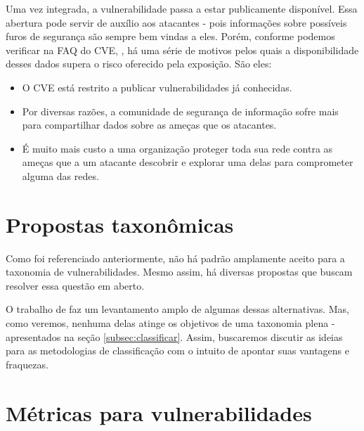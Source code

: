 			
			Uma vez integrada, a vulnerabilidade passa a estar publicamente disponível.
			Essa abertura pode servir de auxílio aos atacantes - pois informações
			sobre possíveis furos de segurança são sempre bem vindas a eles.
			Porém, conforme podemos verificar na FAQ do CVE, \cite{CVE2010}, há uma série
			de motivos pelos quais a disponibilidade desses dados supera o risco
			oferecido pela exposição. São eles:
			\begin{itemize}
				\item{O CVE está restrito a publicar vulnerabilidades já conhecidas.}
				\item{Por diversas razões, a comunidade de segurança de informação
					sofre mais para compartilhar dados sobre as ameças
					que os atacantes.}
				\item{É muito mais custo a uma organização proteger toda sua rede
					contra as ameças que a um atacante descobrir e explorar uma delas para
					comprometer alguma das redes.}
			\end{itemize}
			
			

		
		
		
	\section{Propostas taxonômicas}
		Como foi referenciado anteriormente, não há padrão amplamente aceito
		para a taxonomia de vulnerabilidades.
		Mesmo assim, há diversas propostas que buscam resolver essa questão em aberto.
		
		
		O trabalho de \cite{Gregio2005} faz um levantamento amplo de algumas
		dessas alternativas. Mas, como veremos, nenhuma delas atinge os objetivos
		de uma taxonomia plena - apresentados na seção \ref{subsec:classificar}.
		Assim, buscaremos discutir as ideias para as metodologias
		de classificação com o intuito de apontar suas vantagens e fraquezas.

	\section{Métricas para vulnerabilidades}

